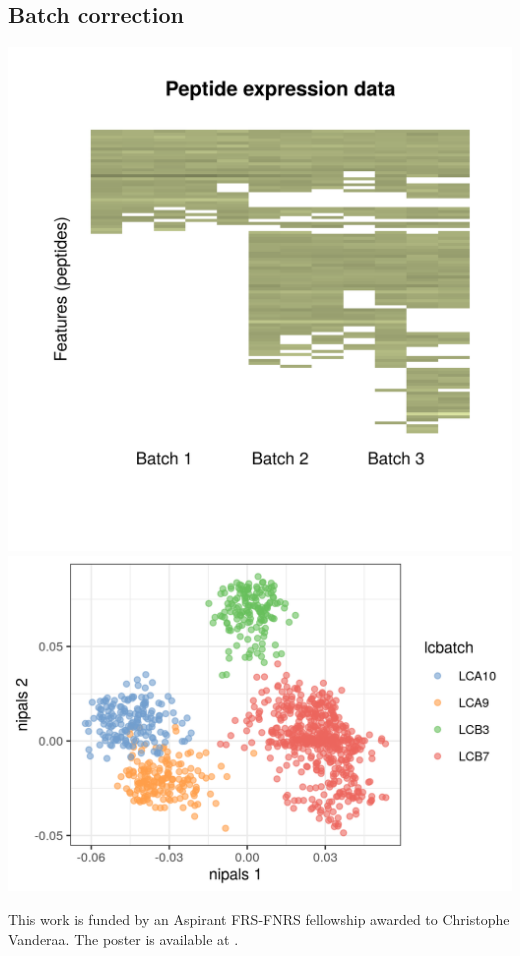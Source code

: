 \documentclass{article}
\begin{document}
\begin{multicols}{2}
\begin{minipage}[t]{\linewidth}
  \section*{\huge Batch correction}
  \includegraphics[width=0.4\linewidth]{figs/batch_effects.png}
  \includegraphics[width=0.55\linewidth]{figs/PCA_batch_effect.png}
\end{minipage}


\noindent
This work is funded by an Aspirant FRS-FNRS fellowship awarded to Christophe Vanderaa. The poster is available at {\color{blue}{}}.

\scriptsize
 


\end{multicols}
\end{document}
